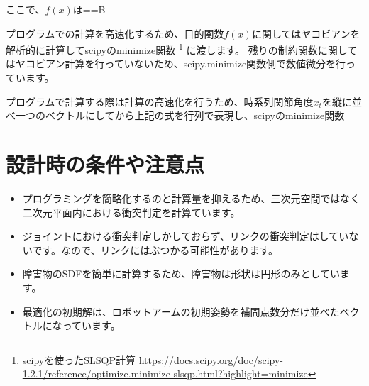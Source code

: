 ここで、$f(x)$は==B

プログラムでの計算を高速化するため、目的関数$f(x)$に関してはヤコビアンを解析的に計算してscipyのminimize関数
\footnote{scipyを使ったSLSQP計算 \url{https://docs.scipy.org/doc/scipy-1.2.1/reference/optimize.minimize-slsqp.html?highlight=minimize}}
に渡します。
残りの制約関数に関してはヤコビアン計算を行っていないため、scipy.minimize関数側で数値微分を行っています。

プログラムで計算する際は計算の高速化を行うため、時系列関節角度$x_t$を縦に並べ一つのベクトルにしてから上記の式を行列で表現し、scipyのminimize関数




\section{設計時の条件や注意点}
\begin{itemize}
  \item プログラミングを簡略化するのと計算量を抑えるため、三次元空間ではなく二次元平面内における衝突判定を計算ています。
  \item ジョイントにおける衝突判定しかしておらず、リンクの衝突判定はしていないです。なので、リンクにはぶつかる可能性があります。
  \item 障害物のSDFを簡単に計算するため、障害物は形状は円形のみとしています。
  \item 最適化の初期解は、ロボットアームの初期姿勢を補間点数分だけ並べたベクトルになっています。
\end{itemize}
